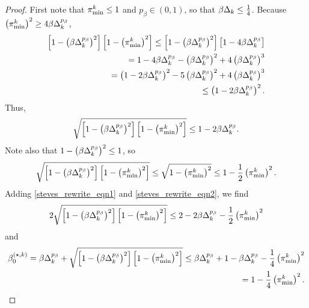 

\begin{proof}
First note that ${\pi^k_{\textrm{min}}} \le 1$ and $p_{\beta} \in (0, 1)$, so that $\beta \Delta_k \le \frac 1 4$.
Because $\left({\pi^k_{\textrm{min}}}\right)^2 \ge 4\beta\Delta_k^{p_{\beta}}$,
\begin{align*}
    \left[1 - \left(\beta \Delta_k ^{p_{\beta}}\right)^2\right]\left[1 - \left({\pi^k_{\textrm{min}}} \right)^2\right]
\le \left[1 - \left(\beta \Delta_k ^{p_{\beta}}\right)^2\right]\left[1 - 4\beta \Delta_k^{p_{\beta}}\right] \\
= 1 - 4 \beta \Delta_k^{p_{\beta}} - \left(\beta \Delta_k^{p_{\beta}}\right)^2 + 4 \left(\beta \Delta_k^{p_{\beta}}\right)^3 \\
= \left(1 - 2 \beta \Delta_k^{p_{\beta}}\right)^2 - 5 \left(\beta\Delta_k^{p_{\beta}}\right)^2 + 4 \left(\beta \Delta_k^{p_{\beta}}\right)^3 \\
\le \left(1 - 2\beta\Delta_k^{p_{\beta}}\right)^2.
\end{align*}
Thus, 
\begin{align}
\label{steves_rewrite_eqn1}
\sqrt{\left[1 - \left(\beta \Delta_k ^{p_{\beta}}\right)^2\right]\left[1 - \left({\pi^k_{\textrm{min}}} \right)^2\right]} 
\le 1 - 2 \beta \Delta_k^{p_{\beta}}.
\end{align}
Note also that $1 - \left(\beta  \Delta_k ^{p_{\beta}}\right)^2 \le 1$, so
\begin{align}
\label{steves_rewrite_eqn2}
\sqrt{\left[1 - \left(\beta \Delta_k ^{p_{\beta}}\right)^2\right]\left[1 - \left({\pi^k_{\textrm{min}}} \right)^2\right]} 
\le \sqrt{1 - \left({\pi^k_{\textrm{min}}} \right)^2} \le 1 - \frac 1 2 \left({\pi^k_{\textrm{min}}} \right)^2.
\end{align}
Adding \cref{steves_rewrite_eqn1} and \cref{steves_rewrite_eqn2}, we find
\begin{align*}
2 \sqrt{\left[1 - \left(\beta \Delta_k ^{p_{\beta}}\right)^2\right]\left[1 - \left({\pi^k_{\textrm{min}}} \right)^2\right]} 
\le 2 - 2 \beta \Delta_k ^{p_{\beta}} - \frac 1 2 \left({\pi^k_{\textrm{min}}} \right)^2
\end{align*}
and
\begin{align*}
{\beta_0^{(\star, k)}} = \beta \Delta_k ^{p_{\beta}} + \sqrt{\left[1 - \left(\beta \Delta_k ^{p_{\beta}}\right)^2\right]\left[1 - \left({\pi^k_{\textrm{min}}} \right)^2\right]}
\le \beta \Delta_k ^{p_{\beta}} + 1 - \beta \Delta_k ^{p_{\beta}} - \frac 1 4 \left({\pi^k_{\textrm{min}}} \right)^2 \\
= 1 - \frac 1 4 \left({\pi^k_{\textrm{min}}} \right)^2.
\end{align*}
\end{proof}

